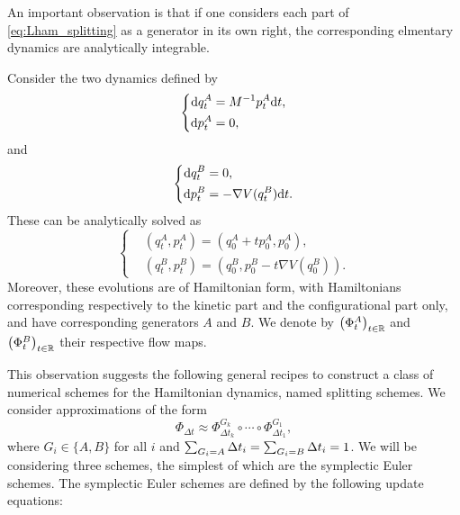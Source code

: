     An important observation is that if one considers each part of \eqref{eq:Lham_splitting} as a generator in its own right, the corresponding elmentary dynamics are analytically integrable.
    \begin{remark}
        \label{rem:Lham_splitting_semigroups}
        Consider the two dynamics defined by
        \begin{equation}
            \label{eq:Lham_splitting_dynamics_A}
            \left\{\begin{aligned}
                \mathrm{d} q_t^A&=M^{-1}p_t^A\mathrm{d} t,\\
                \mathrm{d} p_t^A&=0,
            \end{aligned}\right.
        \end{equation}
        and
        \begin{equation}
            \label{eq:Lham_splitting_dynamics_B}
            \left\{\begin{aligned}
                \mathrm{d} q_t^B&=0,\\
                \mathrm{d} p_t^B&=-\nabla V(q_t^B)\mathrm{d} t.
            \end{aligned}\right.
        \end{equation}
        These can be analytically solved as
        \begin{equation}
            \label{eq:Lham_splitting_dynamics_solved}
            \left\{\begin{aligned}
                &\left(q_t^A,p_t^A\right)=\left(q_0^A+tp_0^A,p_0^A\right),\\
                &\left(q_t^B,p_t^B\right)=\left(q_0^B,p_0^B-t\nabla V\left(q_0^B\right)\right).
            \end{aligned}\right.
        \end{equation} 
        Moreover, these evolutions are of Hamiltonian form, with Hamiltonians corresponding respectively to the kinetic part and the configurational part only, and have corresponding generators $A$ and $B$.
        We denote by $\left(\Phi^A_t\right)_{t \in \mathbb{R}}$ and $\left(\Phi^B_t\right)_{t\in\mathbb{R}}$ their respective flow maps.
    \end{remark}
    This observation suggests the following general recipes to construct a class of numerical schemes for the Hamiltonian dynamics, named splitting schemes. We consider approximations of the form
    \begin{equation}\label{eq:flow_splitting_approximation}\Phi_{\Delta t}\approx \Phi^{G_k}_{\Delta t_k}\circ \dotsm \circ \Phi^{G_1}_{\Delta t_1},\end{equation}
    where $G_i\in\{A,B\}$ for all $i$ and $\sum_{G_i=A}{\Delta t}_i=\sum_{G_i=B}{\Delta t}_i=1$. We will be considering three schemes, the simplest of which are the symplectic Euler schemes.
    The symplectic Euler schemes are defined by the following update equations:
    
